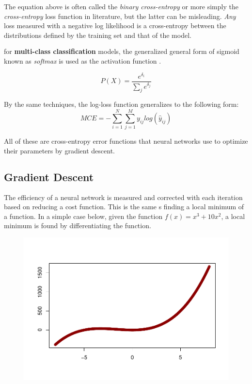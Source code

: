 The equation above is often called the \textit{binary cross-entropy} or more simply the \textit{cross-entropy} loss function in literature, but the latter can be misleading.  \textit{Any} loss measured with a negative log likelihood is a cross-entropy between the distributions defined by the training set and that of the model. \cite{Goodfellow-et-al-2016}

for \textbf{multi-class classification} models, the generalized general form of sigmoid known as \textit{softmax} is used as the activation function \cite{bishop2006pattern}.  

$$
P(X) = \frac{e^{\delta_i}}{\sum_j{e^{\delta_j} }}
$$

By the same techniques, the log-loss function generalizes to the following form:
$$
MCE = -\sum_{i=1}^N \sum_{j=1}^M y_{ij} log (\hat{y}_{ij})
$$

All of these are cross-entropy error functions that neural networks use to optimize their parameters by gradient descent.



\hypertarget{gradient-descent}{%
\subsection{Gradient Descent}\label{gradient-descent}}

The efficiency of a neural network is measured and corrected with each
iteration based on reducing a cost function. This is the same s finding
a local minimum of a function. In a simple case below, given the
function \(f(x) = x^3 + 10x^2\), a local minimum is found by
differentiating the function.

\begin{figure}[H]
    \centering
    \includegraphics[width = .7\textwidth]{Figures/grad_desc_2D-1.pdf}
\end{figure}

